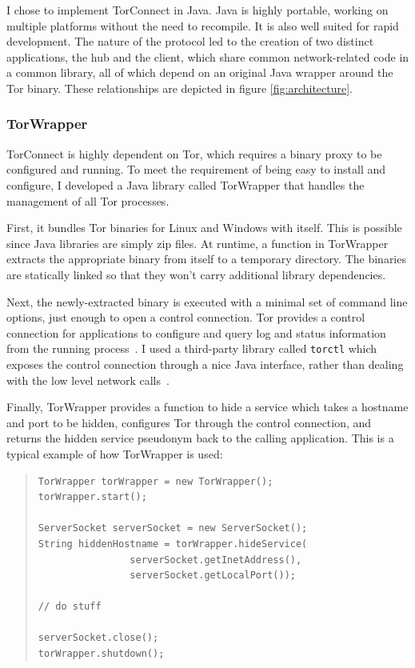 \documentclass{article}
\begin{document}
I chose to implement TorConnect in Java.  Java is highly portable, working on multiple platforms without the need to recompile.  It is also well suited for rapid development.  The nature of the protocol led to the creation of two distinct applications, the hub and the client, which share common network-related code in a common library, all of which depend on an original Java wrapper around the Tor binary.  These relationships are depicted in figure \ref{fig:architecture}.

\subsubsection{TorWrapper}
TorConnect is highly dependent on Tor, which requires a binary proxy to be configured and running.  To meet the requirement of being easy to install and configure, I developed a Java library called TorWrapper that handles the management of all Tor processes.

First, it bundles Tor binaries for Linux and Windows with itself.  This is possible since Java libraries are simply zip files.  At runtime, a function in TorWrapper extracts the appropriate binary from itself to a temporary directory.  The binaries are statically linked so that they won't carry additional library dependencies.

Next, the newly-extracted binary is executed with a minimal set of command line options, just enough to open a control connection.  Tor provides a control connection for applications to configure and query log and status information from the running process~\cite{tor-control}.  I used a third-party library called \verb+torctl+ which exposes the control connection through a nice Java interface, rather than dealing with the low level network calls~\cite{tor-ctl}.

Finally, TorWrapper provides a function to hide a service which takes a hostname and port to be hidden, configures Tor through the control connection, and returns the hidden service pseudonym back to the calling application.  This is a typical example of how TorWrapper is used:
{ \scriptsize
\lstset{language=Java}
\begin{quote}
\begin{lstlisting}
TorWrapper torWrapper = new TorWrapper();
torWrapper.start();

ServerSocket serverSocket = new ServerSocket();
String hiddenHostname = torWrapper.hideService(
				serverSocket.getInetAddress(),
				serverSocket.getLocalPort());

// do stuff

serverSocket.close();
torWrapper.shutdown();
\end{lstlisting}
\end{quote}
}
\end{document}

